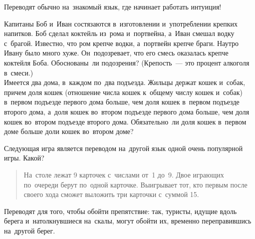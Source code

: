 Переводят обычно на~знакомый язык, где начинает работать интуиция!

\begin{problems}

\item
\subproblem
Капитаны Боб и~Иван состязаются в~изготовлении и~употреблении крепких напитков.
Боб сделал коктейль из~рома и~портвейна, а~Иван смешал водку с~брагой.
Известно, что ром крепче водки, а~портвейн крепче браги.
Наутро Ивану было много хуже.
Он~подозревает, что его смесь оказалась крепче коктейля Боба.
Обоснованы~ли подозрения?
(Крепость~--- это процент алкоголя в~смеси.)
\\
\subproblem
Имеется два дома, в~каждом по~два подъезда.
Жильцы держат кошек и~собак, причем доля кошек (отношение числа кошек к~общему
числу кошек и~собак) в~первом подъезде первого дома больше, чем доля кошек
в~первом подъезде второго дома, а~доля кошек во~втором подъезде первого дома
больше, чем доля кошек во~втором подъезде второго дома.
Обязательно~ли доля кошек в~первом доме больше доли кошек во~втором доме?

\item
Следующая игра является переводом на~другой язык одной очень популярной игры.
Какой?
\begin{quote}
На~столе лежат 9 карточек с~числами от~1 до~9.
Двое играющих по~очереди берут по~одной карточке.
Выигрывает тот, кто первым после своего хода сможет выложить три карточки
с~суммой 15.
\end{quote}

\end{problems}

Переводят для того, чтобы обойти препятствие: так, туристы, идущие вдоль берега
и~натолкнувшиеся на~скалы, могут обойти их, временно переправившись на~другой
берег.

